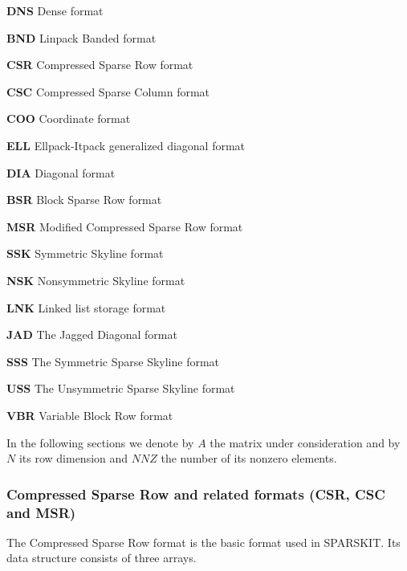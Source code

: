 \documentclass[12pt]{article}
\begin{document}
\begin{description}
\item{{\bf DNS}} Dense format
\item{{\bf BND}} Linpack Banded format
\item{{\bf CSR}} Compressed Sparse Row format 
\item{{\bf CSC}} Compressed Sparse Column format 
\item{{\bf COO}} Coordinate format
\item{{\bf ELL}} Ellpack-Itpack generalized diagonal format
\item{{\bf DIA}} Diagonal format
\item{{\bf BSR}} Block Sparse Row format
\item{{\bf MSR}} Modified Compressed Sparse Row format
\item{{\bf SSK}} Symmetric Skyline format
\item{{\bf NSK}} Nonsymmetric Skyline format
\item{{\bf LNK}} Linked list storage format 
\item{{\bf JAD}} The Jagged Diagonal format 
\item{{\bf SSS}} The Symmetric Sparse Skyline format
\item{{\bf USS}} The Unsymmetric Sparse Skyline format
\item{{\bf VBR}} Variable Block Row format
\end{description}

In the following sections we denote by $A$ the matrix under
consideration and by $N$ its row dimension and $NNZ$ the number of its
nonzero elements.

\subsubsection{Compressed Sparse Row and related formats
 (CSR, CSC and MSR)} The Compressed Sparse Row format is the basic
format used in SPARSKIT. Its  data structure consists of three arrays.
\end{document}

